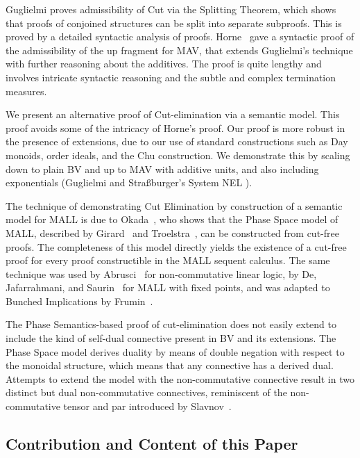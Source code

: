 Guglielmi \cite[\S4.1]{Guglielmi14:di} proves admissibility of Cut via the Splitting Theorem, which shows that proofs of conjoined structures can be split into separate subproofs. This is proved by a detailed syntactic analysis of proofs. Horne~\cite{Horne15:mav} gave a syntactic proof of the admissibility of the up fragment for MAV, that extends Guglielmi's technique with further reasoning about the additives. The proof is quite lengthy and involves intricate syntactic reasoning and the subtle and complex termination measures.

We present an alternative proof of Cut-elimination via a semantic model. This proof avoids some of the intricacy of Horne's proof. Our proof is more robust in the presence of extensions, due to our use of standard constructions such as Day monoids, order ideals, and the Chu construction. We demonstrate this by scaling down to plain BV and up to MAV with additive units, and also including exponentials (Guglielmi and Stra{\ss}burger's System NEL \cite{Burger_2011,GuglielmiS11}).

The technique of demonstrating Cut Elimination by construction of a semantic model for MALL is due to Okada~\cite{Okada99:psc}, who shows that the Phase Space model of MALL, described by Girard~\cite[\S4.1]{Girard87:ll} and Troelstra~\cite[]{Troelstra92:lll}, can be constructed from cut-free proofs.
The completeness of this model directly yields the existence of a cut-free proof for every proof constructible in the MALL sequent calculus.
The same technique was used by Abrusci~\cite{Abrusci91:psc} for non-commutative linear logic, by De, Jafarrahmani, and Saurin~\cite{De22:psc} for MALL with fixed points, and was adapted to Bunched Implications by  Frumin~\cite{Frumin22:psc}.

The Phase Semantics-based proof of cut-elimination does not easily extend to include the kind of self-dual connective present in BV and its extensions.
The Phase Space model derives duality by means of double negation with respect to the monoidal structure, which means that any connective has a derived dual. Attempts to extend the model with the non-commutative connective result in two distinct but dual non-commutative connectives, reminiscent of the non-commutative tensor and par introduced by Slavnov~\cite{Slavnov19:scmll}.

\subsection{Contribution and Content of this Paper}

